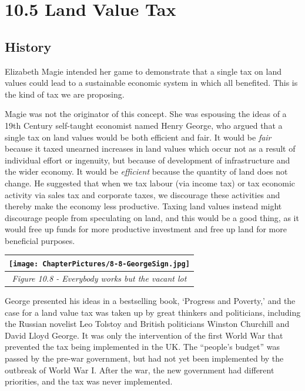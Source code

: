\documentclass[]{tufte-handout}
\begin{document}
\hypertarget{land-value-tax}{%
\section{10.5 Land Value Tax}\label{land-value-tax}}

\hypertarget{history}{%
\subsection{History}\label{history}}

Elizabeth Magie intended her game to demonstrate that a single tax on
land values could lead to a sustainable economic system in which all
benefited. This is the kind of tax we are proposing.

Magie was not the originator of this concept. She was espousing the
ideas of a 19th Century self-taught economist named Henry George, who
argued that a single tax on land values would be both efficient and
fair. It would be \emph{fair} because it taxed unearned increases in
land values which occur not as a result of individual effort or
ingenuity, but because of development of infrastructure and the wider
economy. It would be \emph{efficient} because the quantity of land does
not change. He suggested that when we tax labour (via income tax) or tax
economic activity via sales tax and corporate taxes, we discourage these
activities and thereby make the economy less productive. Taxing land
values instead might discourage people from speculating on land, and
this would be a good thing, as it would free up funds for more
productive investment and free up land for more beneficial purposes.

\begin{longtable}[]{@{}c@{}}
\toprule
\texttt{[image: ChapterPictures/8-8-GeorgeSign.jpg]}\tabularnewline
\midrule
\endhead
\emph{Figure 10.8 - Everybody works but the vacant lot}\tabularnewline
\bottomrule
\end{longtable}

George presented his ideas in a bestselling book, `Progress and
Poverty,' and the case for a land value tax was taken up by great
thinkers and politicians, including the Russian novelist Leo Tolstoy and
British politicians Winston Churchill and David Lloyd George. It was
only the intervention of the first World War that prevented the tax
being implemented in the UK. The ``people's budget'' was passed by the
pre-war government, but had not yet been implemented by the outbreak of
World War I. After the war, the new government had different priorities,
and the tax was never implemented.
\end{document}
